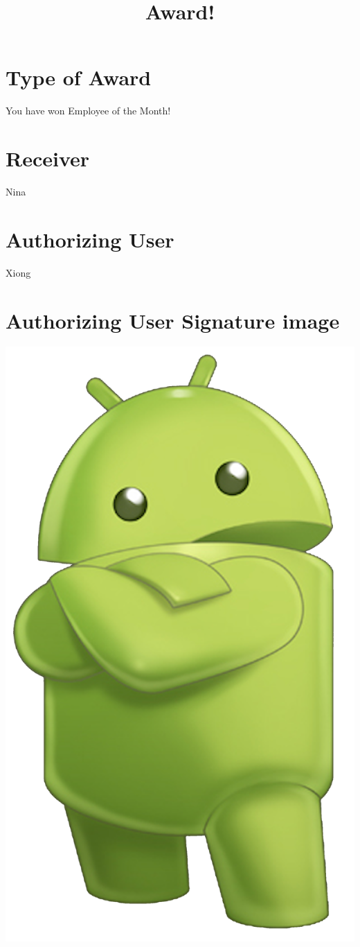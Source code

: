 \documentclass[20pt,a4papper]{article}
\begin{document}
\title{Award!}
\maketitle

\section{Type of Award}
You have won Employee of the Month!

\section{Receiver}
Nina

\section{Authorizing User}
Xiong

\section{Authorizing User Signature image}
\begin{center}
\includegraphics[scale=0.06]{Signature.png}
\end{center}
\end{document}
